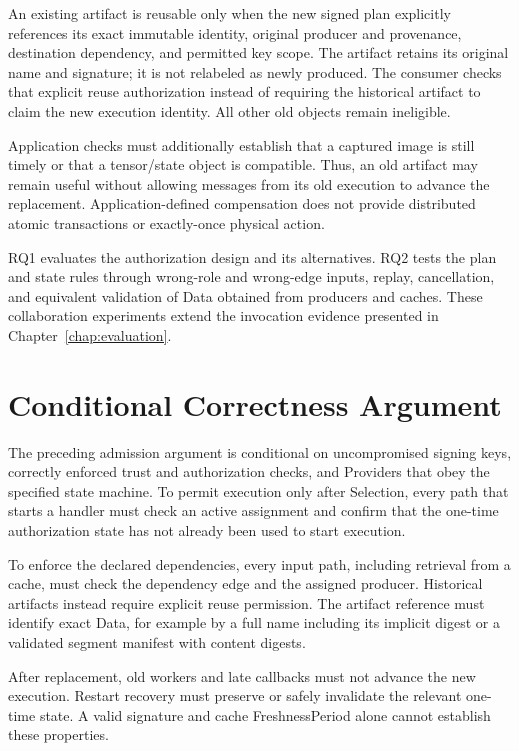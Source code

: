 An existing artifact is reusable only when the new signed plan explicitly references its exact immutable identity, original producer and provenance, destination dependency, and permitted key scope. The artifact retains its original name and signature; it is not relabeled as newly produced. The consumer checks that explicit reuse authorization instead of requiring the historical artifact to claim the new execution identity. All other old objects remain ineligible.

Application checks must additionally establish that a captured image is still timely or that a tensor/state object is compatible. Thus, an old artifact may remain useful without allowing messages from its old execution to advance the replacement. Application-defined compensation does not provide distributed atomic transactions or exactly-once physical action.

RQ1 evaluates the authorization design and its alternatives. RQ2 tests the plan and state rules through wrong-role and wrong-edge inputs, replay, cancellation, and equivalent validation of Data obtained from producers and caches. These collaboration experiments extend the invocation evidence presented in Chapter~\ref{chap:evaluation}.

\section{Conditional Correctness Argument}
The preceding admission argument is conditional on uncompromised signing keys, correctly enforced trust and authorization checks, and Providers that obey the specified state machine. To permit execution only after Selection, every path that starts a handler must check an active assignment and confirm that the one-time authorization state has not already been used to start execution.

To enforce the declared dependencies, every input path, including retrieval from a cache, must check the dependency edge and the assigned producer. Historical artifacts instead require explicit reuse permission. The artifact reference must identify exact Data, for example by a full name including its implicit digest or a validated segment manifest with content digests.

After replacement, old workers and late callbacks must not advance the new execution. Restart recovery must preserve or safely invalidate the relevant one-time state. A valid signature and cache FreshnessPeriod alone cannot establish these properties.

